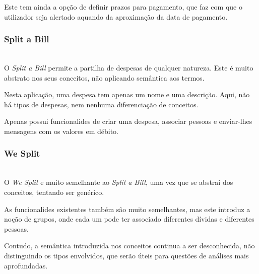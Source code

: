 Este tem ainda a opção de definir prazos para pagamento, que faz com que o utilizador seja alertado aquando da aproximação da data de pagamento.

\subsubsection{Split a Bill}
\mbox{}\\
\-\hspace{0.3cm} O \textit{Split a Bill} permite a partilha de despesas de qualquer natureza. Este é muito abstrato nos seus conceitos, não aplicando semântica aos termos.

Nesta aplicação, uma despesa tem apenas um nome e uma descrição. Aqui, não há tipos de despesas, nem nenhuma diferenciação de conceitos.

Apenas possui funcionalides de criar uma despesa, associar pessoas e enviar-lhes mensagens com os valores em débito.

\subsubsection{We Split}
\mbox{}\\
\-\hspace{0.3cm} O \textit{We Split} e muito semelhante ao \textit{Split a Bill}, uma vez que se abstrai dos conceitos, tentando ser genérico.

As funcionalides existentes também são muito semelhantes, mas este introduz a noção de grupos, onde cada um pode ter associado diferentes dívidas e diferentes pessoas.

Contudo, a semântica introduzida nos conceitos continua a ser desconhecida, não distinguindo os tipos envolvidos, que serão úteis para questões de análises mais aprofundadas.

